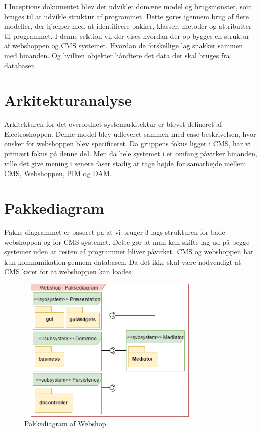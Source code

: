 I Inceptions dokumentet blev der udviklet domæne model og brugsmønster, som bruges til at udvikle struktur af programmet. Dette gøres igennem brug af flere modeller, der hjælper med at identificere pakker, klasser, metoder og attributter til programmet. I denne sektion vil der vises hvordan der op bygges en struktur af webshoppen og CMS systemet. Hvordan de forskellige lag snakker sammen med hinanden. Og hvilken objekter håndtere det data der skal bruges fra databasen.


\section{Arkitekturanalyse}
Arkitekturen for det overordnet systemarkitektur er blevet defineret af Electroshoppen. Denne model blev udleveret sammen med case beskrivelsen, hvor ønsker for webshoppen blev specificeret. Da gruppens fokus ligger i CMS, har vi primært fokus på denne del. Men da hele systemet i et omfang påvirker hinanden, ville det give mening i senere faser stadig at tage højde for samarbejde mellem CMS, Webshoppen, PIM og DAM. 

\section{Pakkediagram} \label{Pakkediagram}
Pakke diagrammet er baseret på at vi bruger 3 lags strukturen for både webshoppen og for CMS systemet. Dette gør at man kan skifte lag ud på begge systemer uden at resten af programmet bliver påvirket. CMS og webshoppen har kun kommunikation gennem databasen. Da det ikke skal være nødvendigt at CMS kører for at webshoppen kan loades. 


\twocolumn
\begin{figure}[H]
  \includegraphics[width=9cm, height=7cm]{elaborationsdokumentet/figurer/analyse/Pakkedia-Webshop.png}
  \caption{Pakkediagram af Webshop}
  \label{Pakkediagram-Webshop}
\end{figure}


